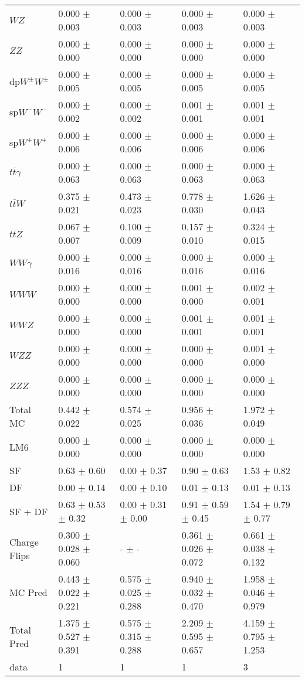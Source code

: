 \begin{tabular}{l | l l l l}
$WZ$ &  0.000 $\pm$  0.003 &  0.000 $\pm$  0.003 &  0.000 $\pm$  0.003 &  0.000 $\pm$  0.003\\
$ZZ$ &  0.000 $\pm$   0.000 &  0.000 $\pm$   0.000 &  0.000 $\pm$   0.000 &  0.000 $\pm$   0.000\\
\hline
dp$W^{\pm}W^{\pm}$ &  0.000 $\pm$  0.005 &  0.000 $\pm$  0.005 &  0.000 $\pm$  0.005 &  0.000 $\pm$  0.005\\
sp$W^{-}W^{-}$ &  0.000 $\pm$  0.002 &  0.000 $\pm$  0.002 &  0.001 $\pm$  0.001 &  0.001 $\pm$  0.001\\
sp$W^{+}W^{+}$ &  0.000 $\pm$  0.006 &  0.000 $\pm$  0.006 &  0.000 $\pm$  0.006 &  0.000 $\pm$  0.006\\
$t\overline{t}\gamma$ &  0.000 $\pm$  0.063 &  0.000 $\pm$  0.063 &  0.000 $\pm$  0.063 &  0.000 $\pm$  0.063\\
$t\overline{t}W$ &  0.375 $\pm$  0.021 &  0.473 $\pm$  0.023 &  0.778 $\pm$  0.030 &  1.626 $\pm$  0.043\\
$t\overline{t}Z$ &  0.067 $\pm$  0.007 &  0.100 $\pm$  0.009 &  0.157 $\pm$  0.010 &  0.324 $\pm$  0.015\\
$WW\gamma$ &  0.000 $\pm$  0.016 &  0.000 $\pm$  0.016 &  0.000 $\pm$  0.016 &  0.000 $\pm$  0.016\\
$WWW$ &   0.000 $\pm$   0.000 &   0.000 $\pm$   0.000 &  0.001 $\pm$   0.000 &  0.002 $\pm$  0.001\\
$WWZ$ &   0.000 $\pm$   0.000 &   0.000 $\pm$   0.000 &  0.001 $\pm$  0.001 &  0.001 $\pm$  0.001\\
$WZZ$ &   0.000 $\pm$   0.000 &   0.000 $\pm$   0.000 &   0.000 $\pm$   0.000 &  0.001 $\pm$   0.000\\
$ZZZ$ &   0.000 $\pm$   0.000 &   0.000 $\pm$   0.000 &   0.000 $\pm$   0.000 &   0.000 $\pm$   0.000\\
\hline
Total MC &  0.442 $\pm$  0.022 &  0.574 $\pm$  0.025 &  0.956 $\pm$  0.036 &  1.972 $\pm$  0.049\\
\hline\hline
\hline
LM6 &  0.000 $\pm$  0.000 &  0.000 $\pm$  0.000 &  0.000 $\pm$  0.000 &  0.000 $\pm$  0.000\\
\hline\hline
\hline\hline
 SF  & 0.63 $\pm$ 0.60 & 0.00 $\pm$ 0.37 & 0.90 $\pm$ 0.63 & 1.53 $\pm$ 0.82\\
 DF  & 0.00 $\pm$ 0.14 & 0.00 $\pm$ 0.10 & 0.01 $\pm$ 0.13 & 0.01 $\pm$ 0.13\\
\hline
 SF + DF  & 0.63 $\pm$ 0.53 $\pm$ 0.32 & 0.00 $\pm$ 0.31 $\pm$ 0.00 & 0.91 $\pm$ 0.59 $\pm$ 0.45 & 1.54 $\pm$ 0.79 $\pm$ 0.77\\
\hline\hline
Charge Flips & 0.300 $\pm$ 0.028 $\pm$ 0.060 & - $\pm$ - & 0.361 $\pm$ 0.026 $\pm$ 0.072 & 0.661 $\pm$ 0.038 $\pm$ 0.132\\
\hline\hline
\hline
MC Pred &  0.443 $\pm$  0.022 $\pm$  0.221 &  0.575 $\pm$  0.025 $\pm$  0.288 &  0.940 $\pm$  0.032 $\pm$  0.470 &  1.958 $\pm$  0.046 $\pm$  0.979\\
\hline\hline
Total Pred &  1.375 $\pm$  0.527 $\pm$  0.391 &  0.575 $\pm$  0.315 $\pm$  0.288 &  2.209 $\pm$  0.595 $\pm$  0.657 &  4.159 $\pm$  0.795 $\pm$  1.253\\
\hline\hline
data & 1 & 1 & 1 & 3\\
\hline\hline
\end{tabular}
